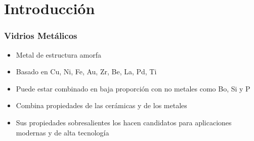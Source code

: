 
\section[Introducci\'on]{Introducci\'on}

\begin{frame}
\frametitle{Vidrios Met\'alicos}

\begin{itemize}
 \item Metal de estructura amorfa
 \item Basado en Cu, Ni, Fe, Au, Zr, Be, La, Pd, Ti
 \item Puede estar combinado en baja proporci\'on con no metales como Bo, Si y P
 \item Combina propiedades de las cer\'amicas y de los metales
 \item Sus propiedades sobresalientes los hacen candidatos para aplicaciones modernas y de alta tecnolog\'ia
\end{itemize}
\end{frame}


\newcommand{\defaultBlocks}{
  \setbeamercolor{block title}{fg=white, bg=hsrmWarmGreyDark}
  \setbeamercolor{block body}{parent=palette secondary}
  \setbeamercolor{block title example}{fg=white, bg=hsrmSec1Dark}
  \setbeamercolor{block body example}{fg=white, bg=hsrmSec1}
  \setbeamercolor{block title alerted}{fg=white, bg=hsrmRedDark}
  \setbeamercolor{block body alerted}{fg=white, bg=hsrmRed}
}

\newcommand{\ventaja}[2]{
  \setbeamercolor{block title}{bg=goodTitle,fg=white}%
  \setbeamercolor{block body}{bg=goodDesc,fg=black}%
  \only<#1>{
    \begin{block}{Ventaja}%
    #2
    \end{block}%
   }
  \defaultBlocks%
}

\newcommand{\desventaja}[2]{
  \setbeamercolor{block title}{bg=alertTitle,fg=white}%
  \setbeamercolor{block body}{bg=alertDesc,fg=black}%
  \only<#1>{
    \begin{block}<#1>{Desventaja}%
    #2
    \end{block}%
   }
  \defaultBlocks%
}

